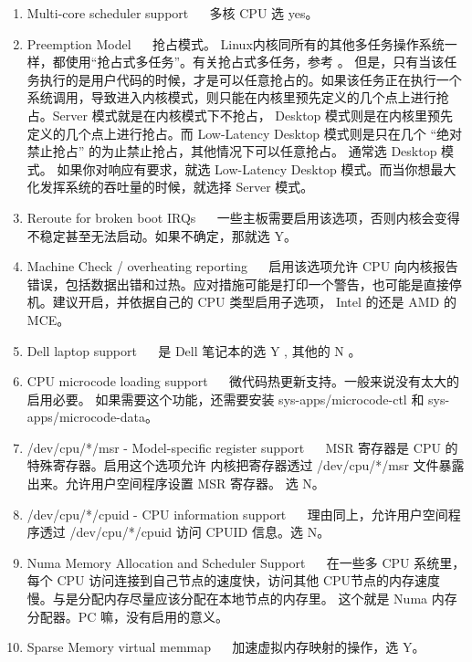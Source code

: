 \begin{enumerate}
\item Multi-core scheduler support ~~ 多核 CPU 选 yes。

\item Preemption Model ~~ 抢占模式。 Linux内核同所有的其他多任务操作系统一样，都使用“抢占式多任务”。有关抢占式多任务，参考 。 但是，只有当该任务执行的是用户代码的时候，才是可以任意抢占的。如果该任务正在执行一个系统调用，导致进入内核模式，则只能在内核里预先定义的几个点上进行抢占。Server 模式就是在内核模式下不抢占， Desktop 模式则是在内核里预先定义的几个点上进行抢占。而 Low-Latency Desktop 模式则是只在几个 “绝对禁止抢占” 的为止禁止抢占，其他情况下可以任意抢占。
通常选 Desktop 模式。 如果你对响应有要求，就选 Low-Latency Desktop 模式。而当你想最大化发挥系统的吞吐量的时候，就选择 Server 模式。

\item Reroute for broken boot IRQs ~~ 一些主板需要启用该选项，否则内核会变得不稳定甚至无法启动。如果不确定，那就选 Y。

\item Machine Check / overheating reporting  ~~ 启用该选项允许 CPU 向内核报告错误，包括数据出错和过热。应对措施可能是打印一个警告，也可能是直接停机。建议开启，并依据自己的 CPU 类型启用子选项，  Intel  的还是 AMD 的 MCE。

\item Dell laptop support ~~ 是 Dell 笔记本的选 Y , 其他的 N 。

\item CPU microcode loading support ~~ 微代码热更新支持。一般来说没有太大的启用必要。 如果需要这个功能，还需要安装 sys-apps/microcode-ctl 和 sys-apps/microcode-data。

\item /dev/cpu/*/msr - Model-specific register support ~~ MSR 寄存器是 CPU 的特殊寄存器。启用这个选项允许 内核把寄存器透过 /dev/cpu/*/msr 文件暴露出来。允许用户空间程序设置 MSR 寄存器。 选 N。
\item /dev/cpu/*/cpuid - CPU information support ~~ 理由同上，允许用户空间程序透过 /dev/cpu/*/cpuid 访问 CPUID 信息。选 N。

\item Numa Memory Allocation and Scheduler Support ~~ 在一些多 CPU 系统里，每个 CPU 访问连接到自己节点的速度快，访问其他 CPU节点的内存速度慢。与是分配内存尽量应该分配在本地节点的内存里。 这个就是 Numa 内存分配器。PC 嘛，没有启用的意义。

\item Sparse Memory virtual memmap ~~ 加速虚拟内存映射的操作，选 Y。


\end{enumerate}
